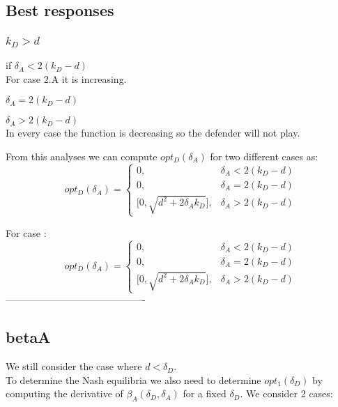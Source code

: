 \subsection{Best responses}
\subsubsection{$k_{D} > d$}
\begin{description}
\item if $\delta_{A} < 2(k_{D} - d)$ \\
For case 2.A it is increasing. 
\item $\delta_{A} = 2(k_{D} - d)$ \\
\item $\delta_{A} > 2(k_{D} - d)$ \\
In every case the function is decreasing so the defender will not play.
\end{description}

From this analyses we can compute $opt_{D}(\delta_{A})$ for two different cases as:
 \begin{displaymath}
  opt_{D}(\delta_{A}) = \left\{
     \begin{array}{lr}
       0, & \delta_{A} < 2(k_{D} - d)\\
       0, & \delta_{A} = 2(k_{D} - d) \\
       \big[0,\sqrt{d^{2} + 2\delta_{A}k_{D}}\big], & \delta_{A} > 2(k_{D} - d)
     \end{array}
   \right.
\end{displaymath}

For case :
 \begin{displaymath}
  opt_{D}(\delta_{A}) = \left\{
     \begin{array}{lr}
       0, & \delta_{A} < 2(k_{D} - d)\\
       0, & \delta_{A} = 2(k_{D} - d) \\
       \big[0,\sqrt{d^{2} + 2\delta_{A}k_{D}}\big], & \delta_{A} > 2(k_{D} - d)
     \end{array}
   \right.
\end{displaymath}
-------------------------------------------\\

\subsection{betaA}
We still consider the case where $d < \delta_{D}$. \\
To determine the Nash equilibria we also need to determine $opt_{1}(\delta_{D})$ by computing the derivative of $\beta_{A}(\delta_{D},\delta_{A})$ for a fixed $\delta_{D}$. We consider 2 cases: \\

